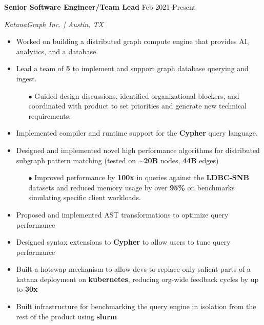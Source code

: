 \documentclass[paper=a4,fontsize=11pt]{scrartcl} %
\newcommand{\EducationEntry}[4]{
		\noindent \textbf{#1}     %
			\hfill#2 \par  %
		\noindent \textit{#3} \par        %
		\noindent\hangafter=0 \small #4 %
		\normalsize \par}
\begin{document}
\EducationEntry{Senior Software Engineer/Team Lead}{Feb 2021-Present}{KatanaGraph Inc. | Austin, TX}{
\begin{itemize}
  \item Worked on building a distributed graph compute engine that provides AI, analytics, and a database.
  \item Lead a team of \textbf{5} to implement and support graph database querying and ingest.
  \begin{itemize}
    \item[$\bullet$] Guided design discussions, identified organizational blockers, and coordinated with product to set priorities and generate new technical requirements.
  \end{itemize}
  \item Implemented compiler and runtime support for the \textbf{Cypher} query language.
  \item Designed and implemented novel high performance algorithms for distributed subgraph pattern matching (tested on $\sim$\textbf{20B} nodes, \textbf{44B} edges)
  \begin{itemize}
    \item[$\bullet$] Improved performance by \textbf{100x} in queries against the \textbf{LDBC-SNB} datasets and reduced memory usage by over \textbf{95\%} on benchmarks simulating specific client workloads.
  \end{itemize}
  \item Proposed and implemented AST transformations to optimize query performance
  \item Designed syntax extensions to \textbf{Cypher} to allow users to tune query performance
  \item Built a hotswap mechanism to allow devs to replace only salient parts of a katana deployment on \textbf{kubernetes}, reducing org-wide feedback cycles by up to \textbf{30x}
  \item Built infrastructure for benchmarking the query engine in isolation from the rest of the product using \textbf{slurm}
\end{itemize}
}
\end{document}

